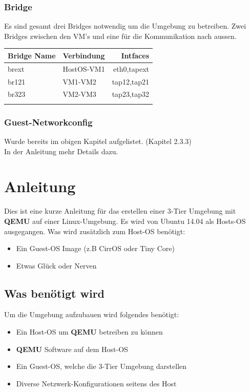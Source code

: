 \documentclass[a4,12pt]{scrartcl}
\begin{document}
\subsubsection{Bridge}
Es sind gesamt drei Bridges notwendig um die Umgebung zu betreiben. Zwei Bridges zwischen den VM's und eine für die Kommunikation  nach aussen.
\begin{center}
    \begin{tabular}{@{} l l r@{}}\toprule    
    {Bridge Name} & {Verbindung} & {Intfaces}\\ \toprule
    brext & HostOS-VM1 & eth0,tapext\\ 
    br121 & VM1-VM2 & tap12,tap21\\
    br323 & VM2-VM3 & tap23,tap32\\ \addlinespace
    \bottomrule
    \end{tabular}
\end{center}
\subsubsection{Guest-Networkconfig}
Wurde bereits im obigen Kapitel aufgelistet. (Kapitel 2.3.3)\\
In der Anleitung mehr Details dazu. 

\section{Anleitung}
Dies ist eine kurze Anleitung für das erstellen einer 3-Tier Umgebung mit \textbf{QEMU} auf einer Linux-Umgebung. Es wird von Ubuntu 14.04 als Hosts-OS ausgegangen.
\newline
Was wird zusätzlich zum Host-OS benötigt:
\begin{itemize}
\item Ein Guest-OS Image (z.B CirrOS oder Tiny Core)
\item Etwas Glück oder Nerven
\end{itemize}

\subsection{Was benötigt wird}
Um die Umgebung aufzubauen wird folgendes benötigt: 
\begin{itemize}
\item Ein Host-OS um \textbf{QEMU} betreiben zu können
\item \textbf{QEMU} Software auf dem Host-OS 
\item Ein Guest-OS, welche die 3-Tier Umgebung darstellen 
\item Diverse Netzwerk-Konfigurationen seitens des Host 
\end{itemize}
\end{document}
